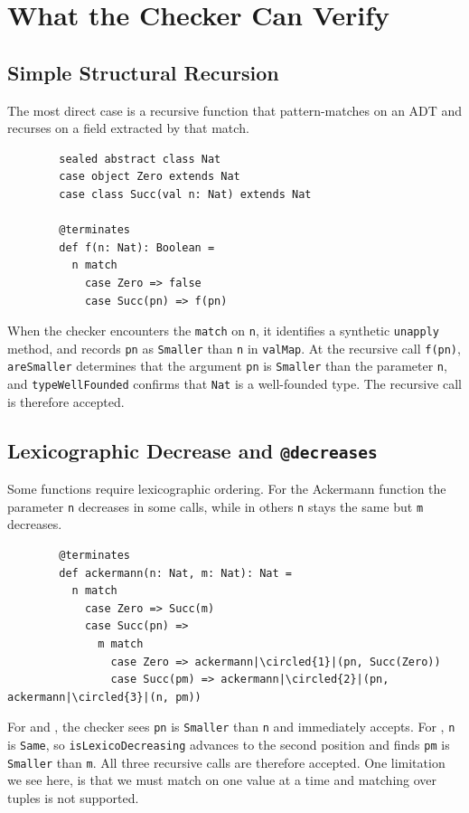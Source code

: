 \section{What the Checker Can Verify}

\subsection{Simple Structural Recursion}
The most direct case is a recursive function that pattern-matches on an ADT and
recurses on a field extracted by that match.
\begin{verbatim}
        sealed abstract class Nat
        case object Zero extends Nat
        case class Succ(val n: Nat) extends Nat

        @terminates
        def f(n: Nat): Boolean =
          n match
            case Zero => false
            case Succ(pn) => f(pn)
\end{verbatim}
When the checker encounters the \texttt{match} on \texttt{n}, it identifies a
synthetic \texttt{unapply} method, and records \texttt{pn} as \texttt{Smaller}
than \texttt{n} in \texttt{valMap}.
At the recursive call \texttt{f(pn)}, \texttt{areSmaller} determines that the
argument \texttt{pn} is \texttt{Smaller} than the parameter \texttt{n}, and
\texttt{typeWellFounded} confirms that \texttt{Nat} is a well-founded type.
The recursive call is therefore accepted.

\subsection{Lexicographic Decrease and \texttt{@decreases}}
Some functions require lexicographic ordering. For the Ackermann function
the parameter \texttt{n} decreases in some calls, while in others \texttt{n}
stays the same but \texttt{m} decreases.
\begin{verbatim}
        @terminates
        def ackermann(n: Nat, m: Nat): Nat =
          n match
            case Zero => Succ(m)
            case Succ(pn) =>
              m match
                case Zero => ackermann|\circled{1}|(pn, Succ(Zero))
                case Succ(pm) => ackermann|\circled{2}|(pn, ackermann|\circled{3}|(n, pm))
\end{verbatim}
For  and , the checker sees \texttt{pn} is
\texttt{Smaller} than \texttt{n} and immediately accepts. For ,
\texttt{n} is \texttt{Same}, so \texttt{isLexicoDecreasing} advances to the
second position and finds \texttt{pm} is \texttt{Smaller} than \texttt{m}. All
three recursive calls are therefore accepted.
One limitation we see here, is that we must match on one value at a time and
matching over tuples is not supported.

